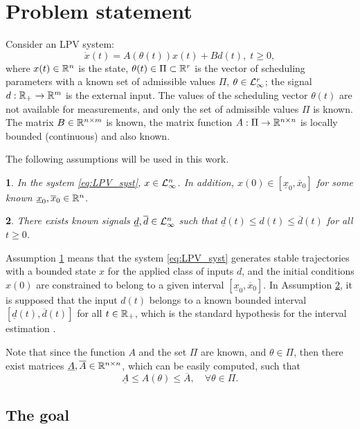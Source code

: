 \documentclass[letterpaper, 10 pt, conference]{ieeeconf}
\theoremstyle{plain}
\theoremstyle{definition}
\theoremstyle{plain}
\newtheorem{assumption}{\protect\assumptionname}
\theoremstyle{plain}
\theoremstyle{remark}
\providecommand{\assumptionname}{Assumption}
\begin{document}
\section{\label{sec:Problem-statement} Problem statement}

Consider an LPV system:
\begin{equation}
\dot{x}(t)=A(\theta(t))x(t)+Bd(t),\;t\geq0,\label{eq:LPV_syst}
\end{equation}
where $x(t)\in\mathbb{R}^{n}$ is the state, $\theta(t)\in\Pi\subset\mathbb{R}^{r}$ is the vector of scheduling parameters with a known set of admissible values $\Pi$, $\theta\in\mathcal{L}_{\infty}^{r}$; the signal $d:\mathbb{R}_{+}\to\mathbb{R}^{m}$ is the external input. The values of the scheduling vector $\theta(t)$ are not available for measurements, and only the set of admissible values $\Pi$ is known. The matrix $B\in\mathbb{R}^{n\times m}$ is known, the matrix function $A:\Pi\to\mathbb{R}^{n\times n}$ is locally bounded (continuous) and also known.

The following assumptions will be used in this work.
\begin{assumption}
\label{ass:a1} In the system \eqref{eq:LPV_syst}, $x\in\mathcal{L}_{\infty}^{n}$. In addition, $x(0)\in[\underline{x}_{0},\overline{x}_{0}]$ for some known $\underline{x}_{0},\overline{x}_{0}\in\mathbb{R}^{n}$.
\end{assumption}

\begin{assumption}
\label{ass:a2} There exists known signals $\underline{d},\overline{d}\in\mathcal{L}_{\infty}^{n}$ such that $\underline{d}(t)\leq d(t)\leq\overline{d}(t)$ for all $t\geq0$.
\end{assumption}
Assumption \ref{ass:a1} means that the system \eqref{eq:LPV_syst} generates stable trajectories with a bounded state $x$ for the applied class of inputs $d$, and the initial conditions $x(0)$ are constrained to belong to a given interval $[\underline{x}_{0},\overline{x}_{0}]$. In Assumption \ref{ass:a2}, it is supposed that the input $d(t)$ belongs to a known bounded interval $[\underline{d}(t),\overline{d}(t)]$ for all $t\in\mathbb{R}_{+}$, which is the standard hypothesis for the interval estimation \cite{Efimov2016,Raiessi2018}.

Note that since the function $A$ and the set $\Pi$ are known, and $\theta\in\Pi$, then there exist matrices $\underline{A},\overline{A}\in\mathbb{R}^{n\times n}$, which can be easily computed, such that 
\[
\underline{A}\leq A(\theta)\leq\overline{A},\quad\forall\theta\in\Pi.
\]

\subsection{The goal}
\end{document}
